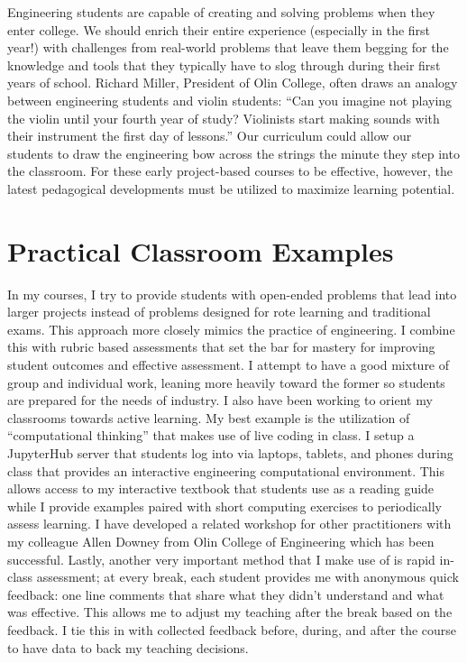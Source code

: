 \documentclass[titlepage]{article}
\begin{document}
Engineering students are capable of creating and solving problems when they
enter college. We should enrich their entire experience (especially in the first
year!) with challenges from real-world problems that leave them begging for the
knowledge and tools that they typically have to slog through during their first
years of school. Richard Miller, President of Olin College, often draws an
analogy between engineering students and violin students: ``Can you imagine not
playing the violin until your fourth year of study? Violinists start making
sounds with their instrument the first day of lessons.'' Our curriculum could
allow our students to draw the engineering bow across the strings the minute
they step into the classroom. For these early project-based courses to be
effective, however, the latest pedagogical developments must be utilized to
maximize learning potential.

\section*{Practical Classroom Examples}
%
In my courses, I try to provide students with open-ended problems that
lead into larger projects instead of problems designed for rote learning and
traditional exams. This approach more closely mimics the practice of
engineering. I combine this with rubric based assessments that set the bar for
mastery for improving student outcomes and effective assessment. I attempt to
have a good mixture of group and individual work, leaning more heavily toward
the former so students are prepared for the needs of industry. I also have been
working to orient my classrooms towards active learning. My best example is the
utilization of ``computational thinking'' that makes use of live coding in
class. I setup a JupyterHub server that students log into via laptops,
tablets, and phones during class that provides an interactive engineering
computational environment. This allows access to my interactive textbook that
students use as a reading guide while I provide examples paired with short
computing exercises to periodically assess learning. I have developed a related
workshop for other practitioners with my colleague Allen Downey from Olin
College of Engineering which has been successful. Lastly, another very
important method that I make use of is rapid in-class assessment; at every
break, each student provides me with anonymous quick feedback: one line
comments that share what they didn't understand and what was effective.  This
allows me to adjust my teaching after the break based on the feedback. I tie
this in with collected feedback before, during, and after the course to have
data to back my teaching decisions.
\end{document}
